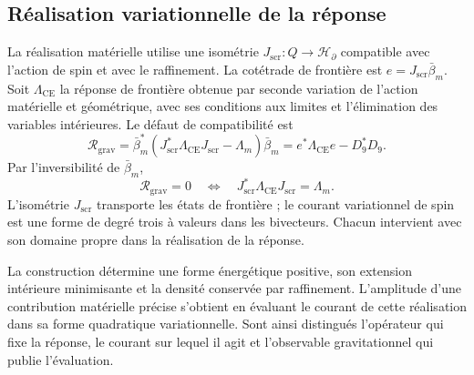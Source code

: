 \subsection{Réalisation variationnelle de la réponse}
\label{vii:vii:sec:realizacion-respuesta}

La réalisation matérielle utilise une isométrie \(J_{\mathrm{scr}}:Q\longrightarrow\mathcal H_\partial\) compatible avec l'action de spin et avec le raffinement. La cotétrade de frontière est \(e=J_{\mathrm{scr}}\bar\beta_m\). Soit \(\Lambda_{\mathrm{CE}}\) la réponse de frontière obtenue par seconde variation de l'action matérielle et géométrique, avec ses conditions aux limites et l'élimination des variables intérieures. Le défaut de compatibilité est
\begin{equation}
 \mathcal R_{\mathrm{grav}}
 =\bar\beta_m^*
   (J_{\mathrm{scr}}^*\Lambda_{\mathrm{CE}}J_{\mathrm{scr}}-\Lambda_m)
   \bar\beta_m
 =e^*\Lambda_{\mathrm{CE}}e-D_9^*D_9.
 \label{vii:vii:eq:defecto-respuesta}
\end{equation}
Par l'inversibilité de \(\bar\beta_m\),
\[
 \mathcal R_{\mathrm{grav}}=0
 \quad\Longleftrightarrow\quad
 J_{\mathrm{scr}}^*\Lambda_{\mathrm{CE}}J_{\mathrm{scr}}=\Lambda_m.
\]
L'isométrie \(J_{\mathrm{scr}}\) transporte les états de frontière ;
le courant variationnel de spin est une forme de degré trois à valeurs
dans les bivecteurs. Chacun intervient avec son domaine propre dans la
réalisation de la réponse.

La construction détermine une forme énergétique positive, son extension
intérieure minimisante et la densité conservée par raffinement.
L'amplitude d'une contribution matérielle précise s'obtient en évaluant
le courant de cette réalisation dans sa forme quadratique variationnelle.
Sont ainsi distingués l'opérateur qui fixe la réponse, le courant
sur lequel il agit et l'observable gravitationnel qui publie l'évaluation.
